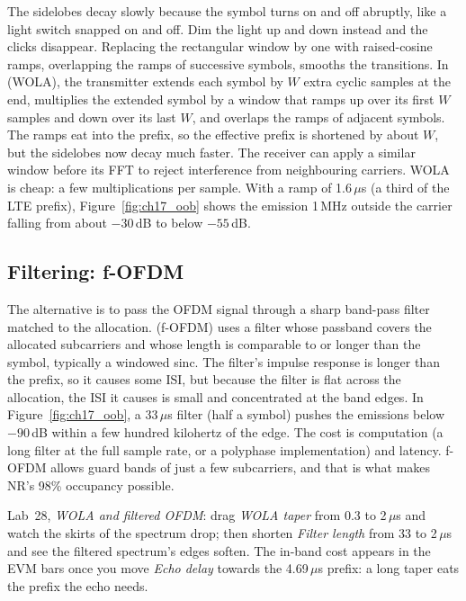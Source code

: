 The sidelobes decay slowly because the symbol turns on and off abruptly, like a light switch
snapped on and off. Dim the light up and down instead and the clicks disappear. Replacing the
rectangular window by one with raised-cosine ramps, overlapping the ramps of successive symbols,
smooths the transitions. In  (WOLA), the transmitter extends each symbol by
$W$ extra cyclic samples at the end, multiplies the extended symbol by a window that ramps up over its first
$W$ samples and down over its last $W$, and overlaps the ramps of adjacent symbols. The ramps eat into the
prefix, so the effective prefix is shortened by about $W$, but the sidelobes now decay much faster. The
receiver can apply a similar window before its FFT to reject interference from neighbouring carriers. WOLA is
cheap: a few multiplications per sample. With a ramp of 1.6\,$\mu$s (a third of the LTE prefix),
Figure~\ref{fig:ch17_oob} shows the emission 1\,MHz outside the carrier falling from about $-30$\,dB to below
$-55$\,dB.

\subsection{Filtering: f-OFDM}

The alternative is to pass the OFDM signal through a sharp band-pass filter matched to the allocation.
 (f-OFDM) uses a filter whose passband covers the allocated subcarriers and whose length is
comparable to or longer than the symbol, typically a windowed sinc. The filter's impulse response is longer than
the prefix, so it causes some ISI, but because the filter is flat across the allocation, the ISI it causes is small
and concentrated at the band edges. In Figure~\ref{fig:ch17_oob}, a 33\,$\mu$s filter (half a symbol) pushes the
emissions below $-90$\,dB within a few hundred kilohertz of the edge. The cost is computation (a long filter at the
full sample rate, or a polyphase implementation) and latency. f-OFDM allows guard bands of just a few subcarriers,
and that is what makes NR's 98\% occupancy possible.

\begin{tryit}
Lab~28, \emph{WOLA and filtered OFDM}: drag \emph{WOLA taper} from 0.3 to 2\,$\mu$s and watch the
skirts of the spectrum drop; then shorten \emph{Filter length} from 33 to 2\,$\mu$s and see the
filtered spectrum's edges soften. The in-band cost appears in the EVM bars once you move
\emph{Echo delay} towards the 4.69\,$\mu$s prefix: a long taper eats the prefix the echo needs.
\end{tryit}

